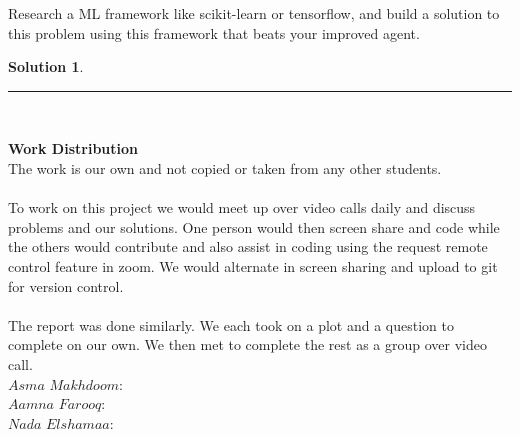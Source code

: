 \documentclass{article}
\theoremstyle{definition}
\def\fline{\rule{0.75\linewidth}{0.5pt}}
\newcommand{\finishline}{\vspace{-15pt}\begin{center}\fline\end{center}}
\newtheorem*{solution*}{Solution}
\newenvironment{solution}{\begin{solution*}}{{\finishline} \end{solution*}}
\begin{document}
    Research a ML framework like scikit-learn or tensorflow, and build a solution to this problem using this framework that beats your improved agent.
    \begin{solution} \hfill \\
    
    \end{solution}\\

\smallskip   

\textbf{Work Distribution}
\\
The work is our own and not copied or taken from any other students. 
\\\\
To work on this project we would meet up over video calls daily and discuss problems and our solutions. One person would then screen share and code while the others would contribute and also assist in coding using the request remote control feature in zoom. We would alternate in screen sharing and upload to git for version control. 
\\\\
The report was done similarly. We each took on a plot and a question to complete on our own. We then met to complete the rest as a group over video call. 
\\
$Asma$ $Makhdoom:$ 
\\
$Aamna$ $Farooq:$ 
\\
$Nada$ $Elshamaa:$ 
\\
\smallskip
\end{document}

